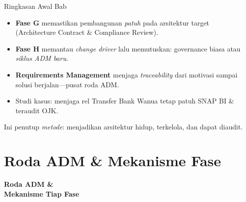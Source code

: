 \documentclass[aspectratio=169, table]{beamer}
\newcommand{\sectionframe}[1]{%
  \begin{frame}{\hfill}
    \centering
    \Huge{\textbf{#1}}
  \end{frame}
}
\newcommand{\takeaway}[1]{%
  \vspace{4pt}
  {\footnotesize #1}
}
\begin{document}
\begin{frame}{Ringkasan Awal Bab}
  \vspace{6pt}
  \begin{itemize}
    \item \textbf{Fase G} memastikan pembangunan \emph{patuh} pada arsitektur
          target (Architecture Contract \& Compliance Review).
    \item \textbf{Fase H} memantau \emph{change driver} lalu memutuskan: governance
          biasa atau \emph{siklus ADM baru}.
    \item \textbf{Requirements Management} menjaga \emph{traceability} dari motivasi
          sampai solusi berjalan---pusat roda ADM.
    \item Studi kasus: menjaga rel Transfer Bank Wanua tetap patuh SNAP BI \&
          teraudit OJK.
  \end{itemize}
  \takeaway{Ini penutup \emph{metode}: menjadikan arsitektur hidup, terkelola, dan
  dapat diaudit.}
\end{frame}

\section{Roda ADM \& Mekanisme Fase}
\sectionframe{Roda ADM \&\\ Mekanisme Tiap Fase}
\end{document}
